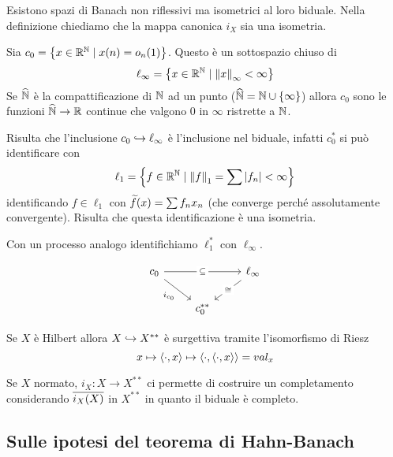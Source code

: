 \begin{remark}
Esistono spazi di Banach non riflessivi ma isometrici al loro biduale. Nella definizione chiediamo che la mappa canonica $i_X$ sia una isometria.
\end{remark}

\begin{example}
Sia $c_0=\left\{{x\in \mathbb{R}^{\mathbb{N}}\mid x(n)=o_n(1)}\right\}$. Questo \`e un sottospazio chiuso di \[\ell_\infty=\left\{{x\in \mathbb{R}^{\mathbb{N}}\mid \left\Vert{x}\right\Vert_\infty< \infty}\right\}\]
Se $\widehat{\mathbb{N}}$ \`e la compattificazione di $\mathbb{N}$ ad un punto ($\widehat{\mathbb{N}}=\mathbb{N}\cup\left\{{\infty}\right\}$) allora $c_0$ sono le funzioni $\widehat{\mathbb{N}}\to \mathbb{R}$ continue che valgono $0$ in $\infty$ ristrette a $\mathbb{N}$.


Risulta che l'inclusione $c_0\hookrightarrow \ell_\infty$ \`e l'inclusione nel biduale, infatti $c_0^\ast$ si pu\`o identificare con
\[\ell_1=\left\{{f\in\mathbb{R}^{\mathbb{N}}\mid \left\Vert{f}\right\Vert_1=\sum\left|{f_n}\right|<\infty}\right\}\]
identificando $f\in \ell_1$ con $\widetilde{f}(x)=\sum f_n x_n$ (che converge perch\'e assolutamente convergente). Risulta che questa identificazione \`e una isometria. 

Con un processo analogo identifichiamo $\ell_1^\ast$ con $\ell_\infty$.

\[\begin{tikzcd}
	{c_0} && {\ell_\infty} \\
	& {c_0^{\ast\ast}}
	\arrow["\subseteq"{description}, from=1-1, to=1-3]
	\arrow["{i_{c_0}}"', from=1-1, to=2-2]
	\arrow["\cong"{description}, from=1-3, to=2-2]
\end{tikzcd}\]
\end{example}

\begin{remark}
Se $X$ \`e Hilbert allora $X\hookrightarrow X^{\ast\ast}$ \`e surgettiva tramite l'isomorfismo di Riesz
\[x\mapsto \left\langle {\cdot,x}\right\rangle\mapsto \left\langle {\cdot,\left\langle {\cdot,x}\right\rangle}\right\rangle=val_x\]
\end{remark}

\begin{remark}
Se $X$ normato, $i_X:X\to X^{\ast\ast}$ ci permette di costruire un completamento considerando $\overline{i_X(X)}$ in $X^{\ast\ast}$ in quanto il biduale \`e completo.
\end{remark}


\subsection{Sulle ipotesi del teorema di Hahn-Banach}


